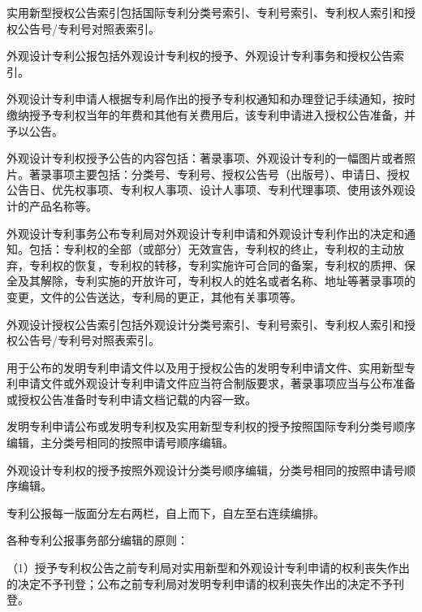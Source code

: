 实用新型授权公告索引包括国际专利分类号索引、专利号索引、专利权人索引和授权公告号/专利号对照表索引。

外观设计专利公报包括外观设计专利权的授予、外观设计专利事务和授权公告索引。

外观设计专利申请人根据专利局作出的授予专利权通知和办理登记手续通知，按时缴纳授予专利权当年的年费和其他有关费用后，该专利申请进入授权公告准备，并予以公告。

外观设计专利权授予公告的内容包括：著录事项、外观设计专利的一幅图片或者照片。著录事项主要包括：分类号、专利号、授权公告号（出版号）、申请日、授权公告日、优先权事项、专利权人事项、设计人事项、专利代理事项、使用该外观设计的产品名称等。

外观设计专利事务公布专利局对外观设计专利申请和外观设计专利作出的决定和通知。包括：专利权的全部（或部分）无效宣告，专利权的终止，专利权的主动放弃，专利权的恢复，专利权的转移，专利实施许可合同的备案，专利权的质押、保全及其解除，专利实施的开放许可，专利权人的姓名或者名称、地址等著录事项的变更，文件的公告送达，专利局的更正，其他有关事项等。

外观设计授权公告索引包括外观设计分类号索引、专利号索引、专利权人索引和授权公告号/专利号对照表索引。

用于公布的发明专利申请文件以及用于授权公告的发明专利申请文件、实用新型专利申请文件或外观设计专利申请文件应当符合制版要求，著录事项应当与公布准备或授权公告准备时专利申请文档记载的内容一致。

发明专利申请公布或发明专利权及实用新型专利权的授予按照国际专利分类号顺序编辑，主分类号相同的按照申请号顺序编辑。

外观设计专利权的授予按照外观设计分类号顺序编辑，分类号相同的按照申请号顺序编辑。

专利公报每一版面分左右两栏，自上而下，自左至右连续编排。

各种专利公报事务部分编辑的原则：

{\setlength{\parindent}{17.1bp}（1）授予专利权公告之前专利局对实用新型和外观设计专利申请的权利丧失作出的决定不予刊登；公布之前专利局对发明专利申请的权利丧失作出的决定不予刊登。\par}

